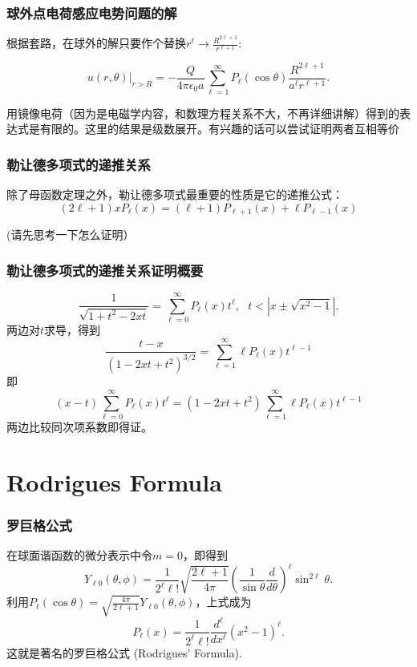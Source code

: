 \documentclass[CJK]{beamer}
\begin{document}
\begin{frame}
\frametitle{球外点电荷感应电势问题的解}

根据套路，在球外的解只要作个替换$r^\ell \rightarrow \frac{R^{2\ell +1}}{r^{\ell+1}}$:

$$\left. u(r, \theta)\right\vert_{r>R} = - \frac{Q}{4\pi\epsilon_0a}\sum_{\ell= 1}^\infty P_{\ell}(\cos\theta)\frac{R^{2\ell+1}}{a^\ell r^{\ell +1}}. $$

用镜像电荷（因为是电磁学内容，和数理方程关系不大，不再详细讲解）得到的表达式是有限的。这里的结果是级数展开。有兴趣的话可以尝试证明两者互相等价

\end{frame}




\begin{frame}
\frametitle{勒让德多项式的递推关系}

除了母函数定理之外，勒让德多项式最重要的性质是它的递推公式：
\tbox
    {$$ (2\ell+1)xP_\ell(x) = (\ell+1)P_{\ell+1}(x)+\ell P_{\ell-1}(x)$$ }

    (请先思考一下怎么证明）

\end{frame}

\begin{frame}
\frametitle{勒让德多项式的递推关系证明概要}

  $$ \frac{1}{\sqrt{1+t^2-2xt}} = \sum_{\ell =0}^\infty P_\ell (x) t^\ell,\ \ \ t<|x\pm \sqrt{x^2-1}|  .$$
两边对$t$求导，得到
$$ \frac{t-x}{(1-2xt+t^2)^{3/2}} =  \sum_{\ell = 1}^\infty \ell P_\ell(x)t^{\ell-1}$$
即
$$(x-t)\sum_{\ell=0}^\infty P_\ell(x)t^\ell  = (1-2xt+t^2)\sum_{\ell=1}^\infty \ell P_\ell(x)t^{\ell-1}$$
两边比较同次项系数即得证。

\end{frame}


\section{Rodrigues Formula}


\begin{frame}
  \frametitle{罗巨格公式}
  
  在球面谐函数的微分表示中令$m=0$，即得到
  $$ Y_{\ell 0}(\theta, \phi) = \frac{1}{2^\ell \ell!}\sqrt{\frac{2\ell+1}{4\pi}} \left(\frac{1}{\sin\theta}\frac{d}{d\theta}\right)^\ell \sin^{2\ell}\theta. $$
  利用$P_\ell(\cos\theta) = \sqrt{\frac{4\pi}{2\ell+1}}Y_{\ell 0}(\theta,\phi)$，上式成为
  \tbox
  {\blue  $$P_\ell(x) = \frac{1}{2^\ell \ell!}\frac{d^\ell}{dx^\ell}(x^2-1)^\ell.$$}
    这就是著名的{\blue 罗巨格公式 (Rodrigues' Formula)}.
  
  
\end{frame}
\end{document}
